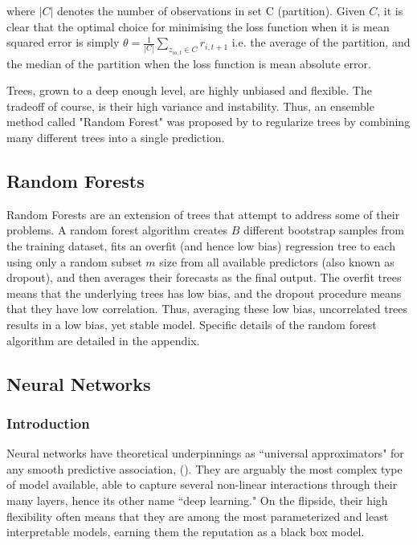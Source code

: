 \documentclass[a4paper, table]{article}
\begin{document}
where $|C|$ denotes the number of observations in set C (partition). Given $C$, it is clear that the optimal choice for minimising the loss function when it is mean squared error is simply $\theta = \frac{1}{|C|} \sum_{z_{io,t}\in C}^{ }r_{i,t+1}$ i.e. the average of the partition, and the median of the partition when the loss function is mean absolute error.

Trees, grown to a deep enough level, are highly unbiased and flexible. The tradeoff of course, is their high variance and instability. Thus, an ensemble method called "Random Forest" was proposed by \cite{breiman_random_2001} to regularize trees by combining many different trees into a single prediction.

\subsection{Random Forests}
Random Forests are an extension of trees that attempt to address some of their problems. A random forest algorithm creates $B$ different bootstrap samples from the training dataset, fits an overfit (and hence low bias) regression tree to each using only a random subset $m$ size from all available predictors (also known as dropout), and then averages their forecasts as the final output. The overfit trees means that the underlying trees has low bias, and the dropout procedure means that they have low correlation. Thus, averaging these low bias, uncorrelated trees results in a low bias, yet stable model. Specific details of the random forest algorithm are detailed in the appendix.

\pagebreak

\subsection{Neural Networks}

\subsubsection{Introduction}

Neural networks have theoretical underpinnings as ``universal approximators" for any smooth predictive association, (\cite{hornik_multilayer_1989}). They are arguably the most complex type of model available, able to capture several non-linear interactions through their many layers, hence its other name ``deep learning."  On the flipside, their high flexibility often means that they are among the most parameterized and least interpretable models, earning them the reputation as a black box model.
\end{document}
